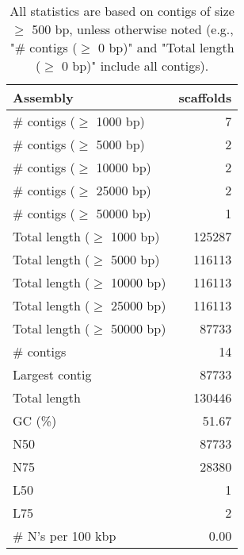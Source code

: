 \documentclass[12pt,a4paper]{article}
\begin{document}
\begin{table}[ht]
\begin{center}
\caption{All statistics are based on contigs of size $\geq$ 500 bp, unless otherwise noted (e.g., "\# contigs ($\geq$ 0 bp)" and "Total length ($\geq$ 0 bp)" include all contigs).}
\begin{tabular}{|l*{1}{|r}|}
\hline
Assembly & scaffolds \\ \hline
\# contigs ($\geq$ 1000 bp) & 7 \\ \hline
\# contigs ($\geq$ 5000 bp) & 2 \\ \hline
\# contigs ($\geq$ 10000 bp) & 2 \\ \hline
\# contigs ($\geq$ 25000 bp) & 2 \\ \hline
\# contigs ($\geq$ 50000 bp) & 1 \\ \hline
Total length ($\geq$ 1000 bp) & 125287 \\ \hline
Total length ($\geq$ 5000 bp) & 116113 \\ \hline
Total length ($\geq$ 10000 bp) & 116113 \\ \hline
Total length ($\geq$ 25000 bp) & 116113 \\ \hline
Total length ($\geq$ 50000 bp) & 87733 \\ \hline
\# contigs & 14 \\ \hline
Largest contig & 87733 \\ \hline
Total length & 130446 \\ \hline
GC (\%) & 51.67 \\ \hline
N50 & 87733 \\ \hline
N75 & 28380 \\ \hline
L50 & 1 \\ \hline
L75 & 2 \\ \hline
\# N's per 100 kbp & 0.00 \\ \hline
\end{tabular}
\end{center}
\end{table}
\end{document}
